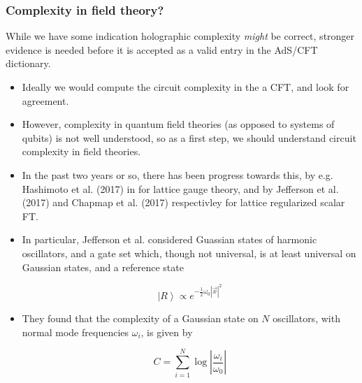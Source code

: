 \documentclass[10pt,aspectratio=169]{beamer}
\newcommand{\ket}[1]{\left| #1 \right>}
\begin{document}
\begin{frame}
\frametitle{Complexity in field theory?}

While we have some indication holographic complexity {\it might} be correct, stronger evidence is needed before it is accepted as a valid entry in the AdS/CFT dictionary.

\begin{itemize}

\item Ideally we would compute the circuit complexity in the a CFT, and look for agreement.

\item However, complexity in quantum field theories (as opposed to systems of qubits) is not well understood, so as a first step, we should understand circuit complexity in field theories.

\item In the past two years or so, there has been progress towards this, by e.g. Hashimoto et al. (2017) in for lattice gauge theory, and by Jefferson et al. (2017) and Chapmap et al. (2017) respectivley for lattice regularized scalar FT.

\item In particular, Jefferson et al. considered Guassian states of harmonic oscillators, and a gate set which, though not universal, is at least universal on Gaussian states, and a reference state

$$\ket{R} \propto e^{-\frac{1}{2} \omega_0 |\vec{x}|^2}$$ 

\item They found that the complexity of a Gaussian state on $N$ oscillators, with normal mode frequencies $\omega_i$, is given by 

$$ C = \sum_{i=1}^N \log\left| \frac{\omega_i}{\omega_0}\right|$$ 

\end{itemize}

\end{frame}
\end{document}
